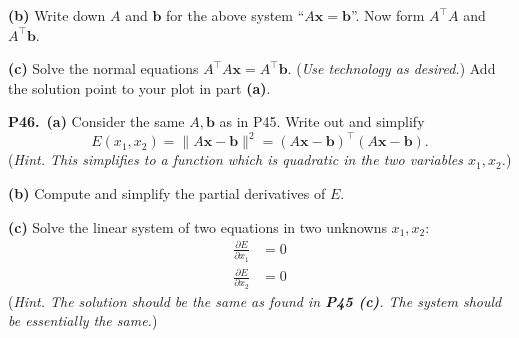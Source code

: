 \documentclass[12pt]{amsart}
\newcommand{\bb}{\bm{b}}
\newcommand{\bx}{\bm{x}}
\newcommand{\prob}[1]{\bigskip\noindent\textbf{#1.}\quad }
\newcommand{\epart}[1]{\medskip\noindent\textbf{(#1)}\quad }
\newcommand{\ppart}[1]{\,\textbf{(#1)}\quad }
\begin{document}
\epart{b} Write down $A$ and $\bb$ for the above system ``$A\bx = \bb$''.  Now form $A^\top A$ and $A^\top \bb$.

\epart{c} Solve the normal equations $A^\top A \bx = A^\top \bb$.  (\emph{Use technology as desired.})  Add the solution point to your plot in part \textbf{(a)}.


\prob{P46}  \ppart{a}  Consider the same $A,\bb$ as in P45.  Write out and simplify
    $$E(x_1,x_2) = \|A\bx - \bb\|^2 = (A\bx - \bb)^\top (A\bx - \bb).$$
(\emph{Hint.  This simplifies to a function which is quadratic in the two variables $x_1,x_2$.})

\epart{b}  Compute and simplify the partial derivatives of $E$.

\epart{c}  Solve the linear system of two equations in two unknowns $x_1,x_2$:
\begin{align*}
\frac{\partial E}{\partial x_1} &= 0 \\
\frac{\partial E}{\partial x_2} &= 0
\end{align*}
(\emph{Hint.  The solution should be the same as found in \textbf{P45 (c)}.  The system should be essentially the same.})
\end{document}
